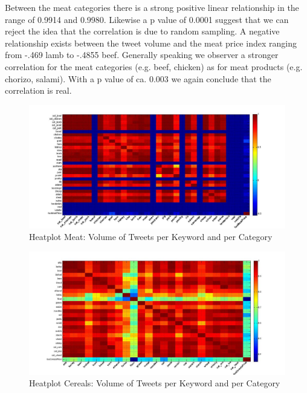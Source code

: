 Between the meat categories there is a strong positive linear relationship in the range of 0.9914 and 0.9980. Likewise a p value of 0.0001 suggest that we can reject the idea that the correlation is due to random sampling. A negative relationship exists between the tweet volume and the meat price index ranging from -.469 lamb to -.4855 beef. Generally speaking we observer a stronger correlation for the meat categories (e.g. beef, chicken) as for meat products (e.g. chorizo, salami). With a p value of ca. 0.003 we again conclude that the correlation is real. 


\begin{figure}[H]
        \centering
         \includegraphics[width=1\textwidth ]{img/anal/meat_heatplot_price}
              
        \caption{Heatplot Meat: Volume of Tweets per Keyword and per Category}
        \label{fig:distribution}
\end{figure}


\begin{figure}[H]
        \centering
         \includegraphics[width=1\textwidth ]{img/anal/cereals_heatplot}
              
        \caption{Heatplot Cereals: Volume of Tweets per Keyword and per Category}
        \label{fig:distribution}
\end{figure}
 
